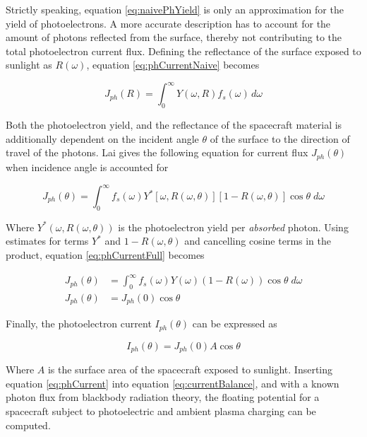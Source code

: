 Strictly speaking, equation \ref{eq:naivePhYield} is only an approximation for the yield of photoelectrons. A more accurate description has to account for the amount of photons reflected from the surface, thereby not contributing to the total photoelectron current flux. Defining the reflectance of the surface exposed to sunlight as $R(\omega)$, equation \ref{eq:phCurrentNaive} becomes 

\begin{equation}\label{eq:phCurrentR}
    J_{ph}(R) = \int^\infty_0 Y(\omega, R) f_s(\omega) \, d\omega
\end{equation}

Both the photoelectron yield, and the reflectance of the spacecraft material is additionally dependent on the incident angle $\theta$ of the surface to the direction of travel of the photons. Lai gives the following equation \insertref{} for current flux $J_{ph}(\theta)$ when incidence angle is accounted for

\begin{equation}\label{eq:phCurrentFull}
    J_{ph}(\theta) = \int^\infty_0 f_s(\omega) Y^{*}[\omega, R(\omega, \theta)][1 - R(\omega, \theta)] \cos \theta \; d\omega
\end{equation}

Where $Y^{*}(\omega, R(\omega, \theta))$ is the photoelectron yield per \emph{absorbed} photon. Using estimates for terms $Y^{*}$ and $1 - R(\omega, \theta)$ and cancelling cosine terms in the product, equation \ref{eq:phCurrentFull} becomes

\begin{subequations}
    \begin{align}
        J_{ph}(\theta) &= \int^\infty_0 f_s(\omega) Y(\omega)(1 - R(\omega)) \cos \theta \; d\omega \\
        J_{ph}(\theta) &= J_{ph}(0) \cos \theta
    \end{align}
\end{subequations}


Finally, the photoelectron current $I_{ph}(\theta)$ can be expressed as 

\begin{equation}\label{eq:phCurrent}
    I_{ph}(\theta) = J_{ph}(0) A \cos \theta 
\end{equation}

Where $A$ is the surface area of the spacecraft exposed to sunlight. Inserting equation \ref{eq:phCurrent} into equation \ref{eq:currentBalance}, and with a known photon flux from blackbody radiation theory, the floating potential for a spacecraft subject to photoelectric and ambient plasma charging can be computed.

